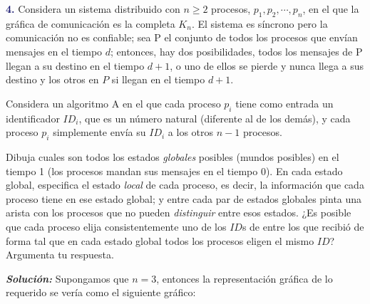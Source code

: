 \newpage
\textbf{\textcolor{MidnightBlue}{4.}} Considera un sistema
distribuido con $n \geq 2$ procesos, $p_1, p_2, \dotsm , p_n$,
en el que la gráfica de comunicación es la completa $K_n$.
El sistema es síncrono pero la comunicación no es confiable;
sea P el conjunto de todos los procesos que envían mensajes en
el tiempo $d$; entonces, hay dos posibilidades, todos los
mensajes de P llegan a su destino en el tiempo $d + 1$, o uno
de ellos se pierde y nunca llega a sus destino y los otros
en $P$ si llegan en el tiempo $d + 1$.
\newline

Considera un algoritmo A en el que cada proceso $p_i$ tiene como
entrada un identificador $ID_i$, que es un número natural (diferente
al de los demás), y cada proceso $p_i$ simplemente envía su $ID_i$
a los otros $n - 1$ procesos.
\newline

Dibuja cuales son todos los estados \textit{globales} posibles
(mundos posibles) en el tiempo 1 (los procesos mandan sus mensajes
en el tiempo 0). En cada estado global, especifica el estado
\textit{local} de cada proceso, es decir, la información que cada
proceso tiene en ese estado global; y entre cada par de estados
globales pinta una arista con los procesos que no pueden \textit{distinguir}
entre esos estados. ¿Es posible que cada proceso elija consistentemente
uno de los $ID$s de entre los que recibió de forma tal que en cada estado
global todos los procesos eligen el mismo $ID$? Argumenta tu respuesta.
\newline

\textbf{\textit{Solución:}}
Supongamos que $n = 3$, entonces la representación gráfica de lo requerido
se vería como el siguiente gráfico:


